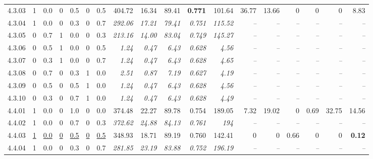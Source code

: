 \begin{table}[!t]
\begin{tabular}{@{}lllllllrrrrrrrrrrr@{}}
    4.3.03 & 1 & 0.0 & 0 & 0.5 & 0 & 0.5 & 404.72 & 16.34 & 89.41 & \textbf{0.771} & 101.64 & 36.77 & 13.66 & 0 & 0 & 0 & 8.83 \\
    4.3.04 & 1 & 0.0 & 0 & 0.3 & 0 & 0.7 & \textit{292.06} & \textit{17.21} & \textit{79.41} & \textit{0.751} & \textit{115.52} & \textit{--} & \textit{--} & \textit{--} & \textit{--} & \textit{--} & \textit{--} \\
    4.3.05 & 0 & 0.7 & 1 & 0.0 & 0 & 0.3 & \textit{213.16} & \textit{14.00} & \textit{83.04} & \textit{0.749} & \textit{145.27} & \textit{--} & \textit{--} & \textit{--} & \textit{--} & \textit{--} & \textit{--} \\
    4.3.06 & 0 & 0.5 & 1 & 0.0 & 0 & 0.5 & \textit{1.24} & \textit{0.47} & \textit{6.43} & \textit{0.628} & \textit{4.56} & \textit{--} & \textit{--} & \textit{--} & \textit{--} & \textit{--} & \textit{--} \\
    4.3.07 & 0 & 0.3 & 1 & 0.0 & 0 & 0.7 & \textit{1.24} & \textit{0.47} & \textit{6.43} & \textit{0.628} & \textit{4.65} & \textit{--} & \textit{--} & \textit{--} & \textit{--} & \textit{--} & \textit{--} \\
    4.3.08 & 0 & 0.7 & 0 & 0.3 & 1 & 0.0 & \textit{2.51} & \textit{0.87} & \textit{7.19} & \textit{0.627} & \textit{4.19} & \textit{--} & \textit{--} & \textit{--} & \textit{--} & \textit{--} & \textit{--} \\
    4.3.09 & 0 & 0.5 & 0 & 0.5 & 1 & 0.0 & \textit{1.24} & \textit{0.47} & \textit{6.43} & \textit{0.628} & \textit{4.56} & \textit{--} & \textit{--} & \textit{--} & \textit{--} & \textit{--} & \textit{--} \\
    4.3.10 & 0 & 0.3 & 0 & 0.7 & 1 & 0.0 & \textit{1.24} & \textit{0.47} & \textit{6.43} & \textit{0.628} & \textit{4.49} & \textit{--} & \textit{--} & \textit{--} & \textit{--} & \textit{--} & \textit{--} \\
    4.4.01 & 1 & 0.0 & 0 & 1.0 & 0 & 0.0 & 374.48 & 22.27 & 89.78 & 0.754 & 189.05 & 7.32 & 19.02 & 0 & 0.69 & 32.75 & 14.56 \\
    4.4.02 & 1 & 0.0 & 0 & 0.7 & 0 & 0.3 & \textit{372.62} & \textit{24.88} & \textit{84.13} & \textit{0.761} & \textit{194} & \textit{--} & \textit{--} & \textit{--} & \textit{--} & \textit{--} & \textit{--} \\
    4.4.03 & \underline{1} & \underline{0.0} & \underline{0} & \underline{0.5} & \underline{0} & \underline{0.5} & 348.93 & 18.71 & 89.19 & 0.760 & 142.41 & 0 & 0 & 0.66 & 0 & 0 & \textbf{0.12} \\
    4.4.04 & 1 & 0.0 & 0 & 0.3 & 0 & 0.7 & \textit{281.85} & \textit{23.19} & \textit{83.88} & \textit{0.752} & \textit{196.19} & \textit{--} & \textit{--} & \textit{--} & \textit{--} & \textit{--} & \textit{--} \\

\end{tabular}
\end{table}
